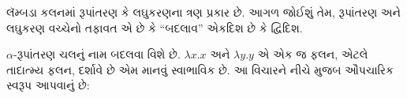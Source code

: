 \documentclass[../../../include/open-logic-section]{subfiles}
\begin{document}

લૅમ્બડા કલનમાં રૂપાંતરણ કે લઘુકરણના ત્રણ
પ્રકાર છે. આગળ જોઈશું તેમ, રૂપાંતરણ અને
લઘુકરણ વચ્ચેનો તફાવત એ છે કે
``બદલાવ'' એકદિશ છે કે દ્વિદિશ.

$\alpha$-રૂપાંતરણ ચલનું નામ બદલવા વિશે છે.
$\lambda x. x$ અને $\lambda y.y$ એ એક
જ ફલન, એટલે તાદાત્મ્ય ફલન, દર્શાવે છે એમ
માનવું સ્વાભાવિક છે. આ વિચારને નીચે મુજબ
ઔપચારિક સ્વરૂપ આપવાનું છે:
\end{document}

